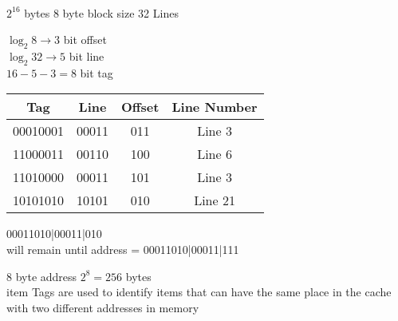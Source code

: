 \documentclass[12pt,largemargins]{homework}
\begin{document}
 \\
$2^16$ bytes $8$ byte block size 32 Lines\\
\begin{alphaparts}
\item
$\log_2 8 \rightarrow 3$ bit offset\\
$\log_2 32 \rightarrow 5$ bit line\\
$16 - 5 -3 = 8$ bit tag\\
\item
\begin{tabular}{|c|c|c|c|}
\hline
Tag&Line&Offset&Line Number\\
\hline
00010001&00011&011&Line 3\\
11000011&00110&100&Line 6\\
11010000&00011&101&Line 3\\
10101010&10101&010&Line 21\\
\hline
\end{tabular}
\item
00011010|00011|010\\
will remain until address = 00011010|00011|111\\
\item
8 byte address $2^8 = 256$ bytes
\\item
Tags are used to identify items that can have the same place in the cache with two different addresses in memory\\
\end{alphaparts}
\end{document}
